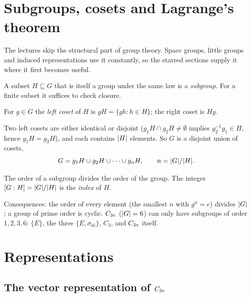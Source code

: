 \section{Subgroups, cosets and Lagrange's theorem\beyondmark}\label{sec:cosets}

The lectures skip the structural part of group theory. Space groups, little groups and
induced representations use it constantly, so the starred sections supply it where it
first becomes useful.

A subset $H\subseteq G$ that is itself a group under the same law is a
\emph{subgroup}. For a finite subset it suffices to check closure.

\begin{definition}
For $g\in G$ the \emph{left coset} of $H$ is $gH=\{gh:h\in H\}$; the right coset is
$Hg$.
\end{definition}
Two left cosets are either identical or disjoint ($g_1H\cap g_2H\neq\emptyset$ implies
$g_2^{-1}g_1\in H$, hence $g_1H=g_2H$), and each contains $\lvert H\rvert$ elements. So $G$ is a
disjoint union of cosets,
\[
G=g_1H\cup g_2H\cup\dots\cup g_nH,\qquad n=\lvert G\rvert/\lvert H\rvert.
\]
\begin{theorem}[Lagrange]
The order of a subgroup divides the order of the group. The integer
$[G:H]=\lvert G\rvert/\lvert H\rvert$ is the \emph{index} of $H$.
\end{theorem}
Consequences: the order of every element (the smallest $n$ with $g^n=e$) divides
$\lvert G\rvert$; a group of prime order is cyclic. $C_{3\mathrm{v}}$ ($\lvert G\rvert=6$) can only have
subgroups of order $1,2,3,6$: $\{E\}$, the three $\{E,\sigma_{\mathrm{d}i}\}$, $C_3$, and
$C_{3\mathrm{v}}$ itself.

\section{Representations}\label{sec:reps}

\subsection{The vector representation of \texorpdfstring{$C_{3\mathrm{v}}$}{C3v}}


